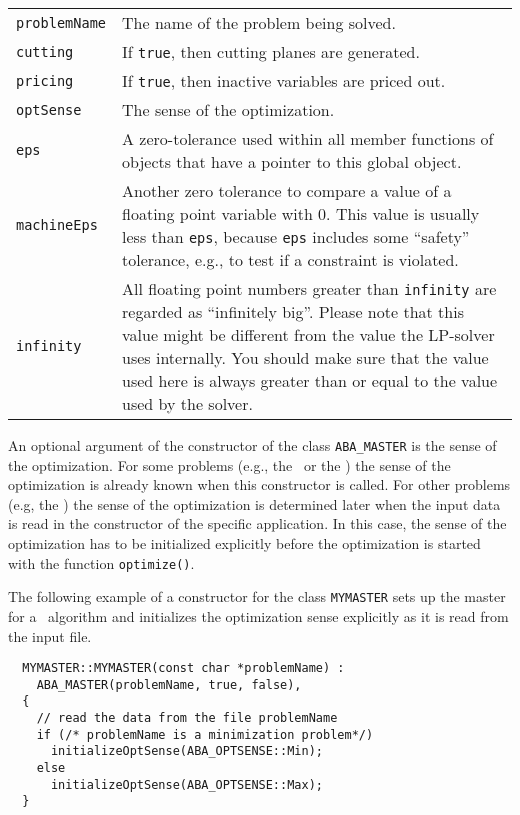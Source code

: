 \begin{center}
\begin{tabular}[b]{lp{}}
  {\tt problemName}&The name of the problem being solved.\\
  {\tt cutting}    &If {\tt true}, then cutting planes are generated.\\
  {\tt pricing}    &If {\tt true}, then inactive variables are priced out.\\
  {\tt optSense}   &The sense of the optimization.\\
  {\tt eps}        &A zero-tolerance used within all member functions of
                    objects that have a pointer to this global object.\\
  {\tt machineEps} &Another zero tolerance to compare a
                    value of a floating point variable with 0. This value
                    is usually less than {\tt eps}, because 
                    {\tt eps} includes
                    some ``safety'' tolerance, e.g., to test if a constraint
                    is violated.\\
  {\tt infinity}   &All floating point numbers greater than {\tt infinity} are
                    regarded as ``infinitely big''.
		    Please note that this value might be different from 
		    the value the LP-solver uses internally.
		    You should make sure that the value used here is always 
		    greater than or equal to the value used by the solver.\\
\end{tabular}
\end{center}

An optional argument of the constructor of the class {\tt ABA\_MASTER}
is the sense of the optimization. For some problems (e.g., the
\bcsp\ or the \tsp) the sense of the optimization is already 
known when this constructor is called. For other problems
(e.g, the \mip) the sense of the optimization is determined later when
the input data is read in the constructor of the specific application.
In this case, the sense of the optimization has to be initialized
explicitly
before the optimization is started with the function {\tt optimize()}.

The following example of a constructor for the class {\tt MYMASTER} sets up
the master for a \bac\ algorithm and initializes the optimization sense
explicitly as it is read from the input file.
\begin{verbatim}
  MYMASTER::MYMASTER(const char *problemName) :
    ABA_MASTER(problemName, true, false),
  {
    // read the data from the file problemName
    if (/* problemName is a minimization problem*/)
      initializeOptSense(ABA_OPTSENSE::Min);
    else
      initializeOptSense(ABA_OPTSENSE::Max);
  }
\end{verbatim}

